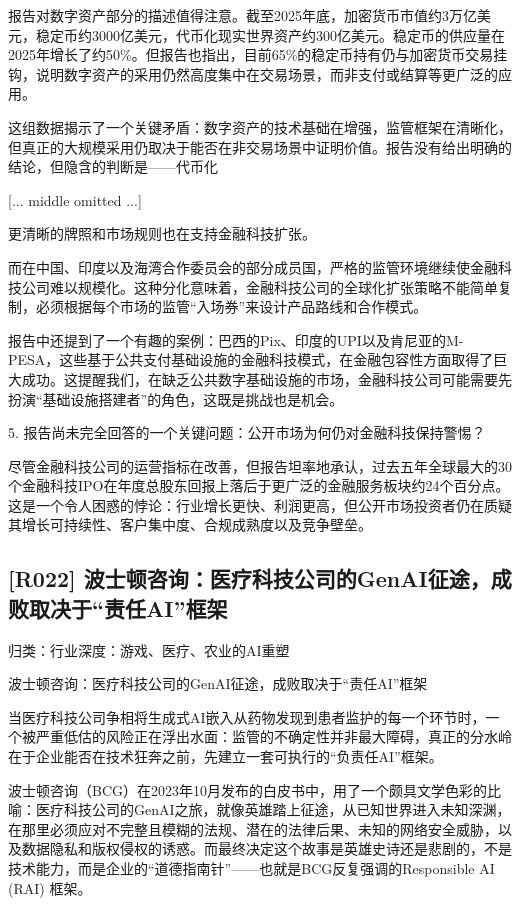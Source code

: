 \documentclass[11pt]{ctexart}
\begin{document}
报告对数字资产部分的描述值得注意。截至2025年底，加密货币市值约3万亿美元，稳定币约3000亿美元，代币化现实世界资产约300亿美元。稳定币的供应量在2025年增长了约50\%。但报告也指出，目前65\%的稳定币持有仍与加密货币交易挂钩，说明数字资产的采用仍然高度集中在交易场景，而非支付或结算等更广泛的应用。

这组数据揭示了一个关键矛盾：数字资产的技术基础在增强，监管框架在清晰化，但真正的大规模采用仍取决于能否在非交易场景中证明价值。报告没有给出明确的结论，但隐含的判断是——代币化

[... middle omitted ...]

更清晰的牌照和市场规则也在支持金融科技扩张。

而在中国、印度以及海湾合作委员会的部分成员国，严格的监管环境继续使金融科技公司难以规模化。这种分化意味着，金融科技公司的全球化扩张策略不能简单复制，必须根据每个市场的监管“入场券”来设计产品路线和合作模式。

报告中还提到了一个有趣的案例：巴西的Pix、印度的UPI以及肯尼亚的M-PESA，这些基于公共支付基础设施的金融科技模式，在金融包容性方面取得了巨大成功。这提醒我们，在缺乏公共数字基础设施的市场，金融科技公司可能需要先扮演“基础设施搭建者”的角色，这既是挑战也是机会。

5. 报告尚未完全回答的一个关键问题：公开市场为何仍对金融科技保持警惕？

尽管金融科技公司的运营指标在改善，但报告坦率地承认，过去五年全球最大的30个金融科技IPO在年度总股东回报上落后于更广泛的金融服务板块约24个百分点。这是一个令人困惑的悖论：行业增长更快、利润更高，但公开市场投资者仍在质疑其增长可持续性、客户集中度、合规成熟度以及竞争壁垒。

\subsection{[R022] 波士顿咨询：医疗科技公司的GenAI征途，成败取决于“责任AI”框架}
{\small\color{refgray}归类：行业深度：游戏、医疗、农业的AI重塑}

波士顿咨询：医疗科技公司的GenAI征途，成败取决于“责任AI”框架

当医疗科技公司争相将生成式AI嵌入从药物发现到患者监护的每一个环节时，一个被严重低估的风险正在浮出水面：监管的不确定性并非最大障碍，真正的分水岭在于企业能否在技术狂奔之前，先建立一套可执行的“负责任AI”框架。

波士顿咨询（BCG）在2023年10月发布的白皮书中，用了一个颇具文学色彩的比喻：医疗科技公司的GenAI之旅，就像英雄踏上征途，从已知世界进入未知深渊，在那里必须应对不完整且模糊的法规、潜在的法律后果、未知的网络安全威胁，以及数据隐私和版权侵权的诱惑。而最终决定这个故事是英雄史诗还是悲剧的，不是技术能力，而是企业的“道德指南针”——也就是BCG反复强调的Responsible AI (RAI) 框架。
\end{document}
